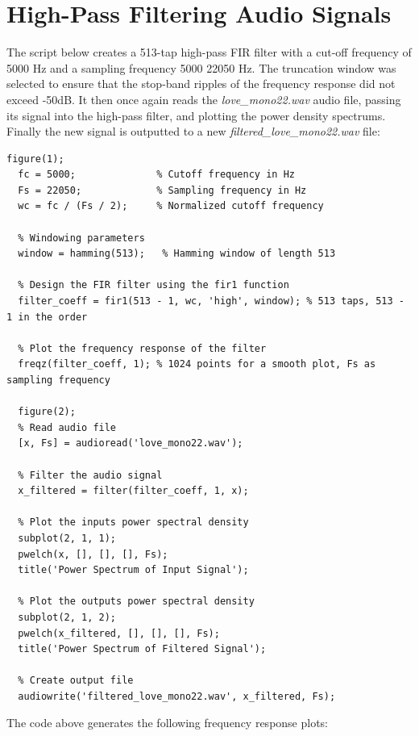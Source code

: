 \documentclass[a4paper, 10pt]{article}
\begin{document}
\section{High-Pass Filtering Audio Signals}
The script below creates a 513-tap high-pass FIR filter with a cut-off frequency of 5000 Hz and a sampling frequency 5000
22050 Hz. The truncation window was selected to ensure that the stop-band ripples of the frequency response did not 
exceed -50dB. It then once again reads the \textit{love\_mono22.wav} audio file, passing its signal into the high-pass filter, 
and plotting the power density spectrums. Finally the new signal is outputted to a new \textit{filtered\_love\_mono22.wav} file:
\begin{lstlisting}[style=Matlab-editor, basicstyle=\small\ttfamily]
  figure(1);
  fc = 5000;              % Cutoff frequency in Hz
  Fs = 22050;             % Sampling frequency in Hz
  wc = fc / (Fs / 2);     % Normalized cutoff frequency

  % Windowing parameters
  window = hamming(513);   % Hamming window of length 513

  % Design the FIR filter using the fir1 function
  filter_coeff = fir1(513 - 1, wc, 'high', window); % 513 taps, 513 - 1 in the order

  % Plot the frequency response of the filter
  freqz(filter_coeff, 1); % 1024 points for a smooth plot, Fs as sampling frequency

  figure(2);
  % Read audio file
  [x, Fs] = audioread('love_mono22.wav');

  % Filter the audio signal
  x_filtered = filter(filter_coeff, 1, x);

  % Plot the inputs power spectral density
  subplot(2, 1, 1);
  pwelch(x, [], [], [], Fs);
  title('Power Spectrum of Input Signal');

  % Plot the outputs power spectral density
  subplot(2, 1, 2);
  pwelch(x_filtered, [], [], [], Fs);
  title('Power Spectrum of Filtered Signal');

  % Create output file
  audiowrite('filtered_love_mono22.wav', x_filtered, Fs);
\end{lstlisting}
The code above generates the following frequency response plots:
\end{document}
